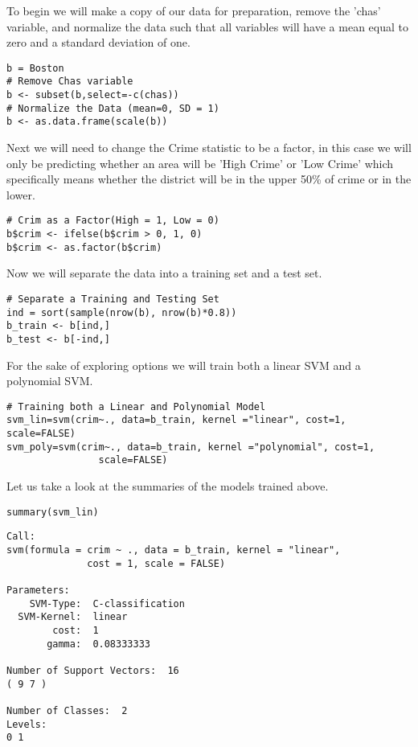 \documentclass[a4paper,man,natbib]{apa6}
\begin{document}
To begin we will make a copy of our data for preparation, remove the 'chas' variable, and normalize the data such that all variables will have a mean equal to zero and a standard deviation of one.

\begin{verbatim}
b = Boston
# Remove Chas variable
b <- subset(b,select=-c(chas))
# Normalize the Data (mean=0, SD = 1)
b <- as.data.frame(scale(b))
\end{verbatim}

Next we will need to change the Crime statistic to be a factor, in this case we will only be predicting whether an area will be 'High Crime' or 'Low Crime' which specifically means whether the district will be in the upper 50\% of crime or in the lower.

\begin{verbatim}
# Crim as a Factor(High = 1, Low = 0)
b$crim <- ifelse(b$crim > 0, 1, 0)
b$crim <- as.factor(b$crim)
\end{verbatim}

Now we will separate the data into a training set and a test set.

\begin{verbatim}
# Separate a Training and Testing Set
ind = sort(sample(nrow(b), nrow(b)*0.8))
b_train <- b[ind,]
b_test <- b[-ind,]
\end{verbatim}

For the sake of exploring options we will train both a linear SVM and a polynomial SVM.

\begin{verbatim}
# Training both a Linear and Polynomial Model
svm_lin=svm(crim~., data=b_train, kernel ="linear", cost=1, scale=FALSE)
svm_poly=svm(crim~., data=b_train, kernel ="polynomial", cost=1, 
				scale=FALSE)
\end{verbatim}

Let us take a look at the summaries of the models trained above.

\begin{verbatim}
summary(svm_lin)
\end{verbatim}

\vspace{-0.5em}

\begin{verbatim}
Call:
svm(formula = crim ~ ., data = b_train, kernel = "linear", 
              cost = 1, scale = FALSE)

Parameters:
    SVM-Type:  C-classification 
  SVM-Kernel:  linear 
        cost:  1 
       gamma:  0.08333333 

Number of Support Vectors:  16
( 9 7 )

Number of Classes:  2 
Levels: 
0 1
\end{verbatim}
\end{document}
